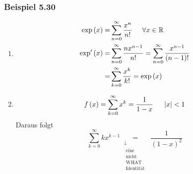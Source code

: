 \subsubsection*{Beispiel 5.30}
\begin{enumerate}
\item \begin{align*}
\exp \left( x \right) = &\sum\limits_{n = 0}^\infty  {\frac{{{x^n}}}{{n!}}} \hspace{5mm}\forall x \in \mathbb{R}\\
{\mathop{\rm exp'}\nolimits} \left( x \right) = &\sum\limits_{n = 0}^\infty  {\frac{{n{x^{n - 1}}}}{{n!}}}  = \sum\limits_{n = 0}^\infty  {\frac{{{x^{n - 1}}}}{{\left( {n - 1} \right)!}}} \\
 = &\sum\limits_{k = 0}^\infty  {\frac{{{x^k}}}{{k!}}}  = \exp \left( x \right)
\end{align*}
\item \[f\left( x \right) = \sum\limits_{k = 0}^\infty  {{x^k}}  = \frac{1}{{1 - x}}\hspace{5mm}\left| x \right| < 1\]
Daraus folgt 
\[\sum\limits_{k = 0}^\infty  {k{x^{k - 1}}} \mathop  = \limits_{\begin{array}{*{20}{c}}
 \downarrow \\
\begin{array}{c}
{\text{eine }}\\
{\text{nicht}}\\
{\text{WHAT}}\\
{\text{Identität}}
\end{array}
\end{array}} \frac{1}{{{{\left( {1 - x} \right)}^2}}}\]
\end{enumerate}